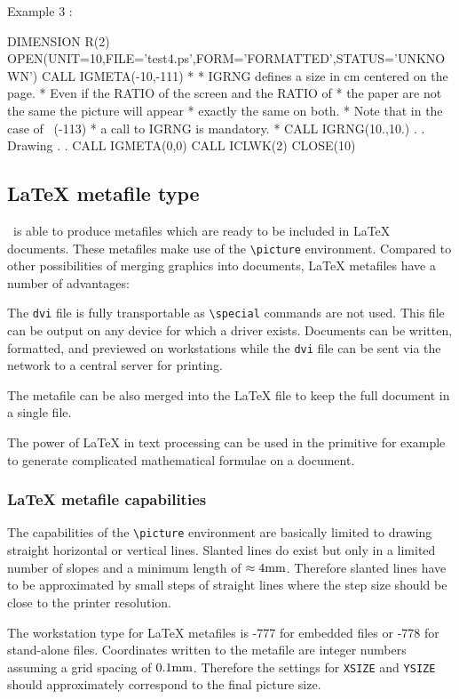 \begin{XMPt}{Example 3 : }

      DIMENSION R(2)
      OPEN(UNIT=10,FILE='test4.ps',FORM='FORMATTED',STATUS='UNKNOWN')
      CALL IGMETA(-10,-111)
*
*              IGRNG defines a size in cm centered on the page.
*              Even if the RATIO of the screen and the RATIO of
*              the paper are not the same the picture will appear
*              exactly the same on both.
*              Note that in the case of \EPS~(-113)
*              a call to IGRNG is mandatory.
*
      CALL IGRNG(10.,10.)
          .
          .
        Drawing
          .
          .
      CALL IGMETA(0,0)
      CALL ICLWK(2)
      CLOSE(10)
\end{XMPt}
\subsection{\LaTeX{} metafile type}
\HIGZ~is able to produce metafiles which are ready to be included in \LaTeX{}
documents. These metafiles make use of the \verb'\picture' environment.
Compared to other possibilities of merging graphics
into documents, \LaTeX{} metafiles have a number of advantages:

\begin{ULc}
\item  The {\tt dvi} file is fully transportable as \verb'\special' commands are
       not used. This file can be output on any device for which a driver
       exists. Documents can be written, formatted, and previewed on
       workstations while the {\tt dvi} file can be sent via the  network to a
       central server for printing.
\item  The metafile can be also merged into the \LaTeX{} file to keep
       the full document in a single file.
\item  The power of \LaTeX{} in text processing can be used in the primitive
        for example to generate complicated mathematical formulae
       on a document.
\end{ULc}

\subsubsection{\LaTeX{} metafile capabilities}

The capabilities of the \verb'\picture' environment are basically limited to
drawing straight horizontal or vertical lines. Slanted lines do exist but only
in a limited number of slopes and a minimum length of $\approx 4 {\rm mm}$.
Therefore slanted lines have to be approximated by small steps of straight lines
where the step size should be close to the printer resolution.
\par
The workstation type for \LaTeX{} metafiles is -777 for embedded files or
-778 for stand-alone files. Coordinates written to the metafile are integer
numbers assuming a grid spacing of $0.1 {\rm mm}$. Therefore the settings for
{\tt XSIZE} and {\tt YSIZE} should approximately correspond to the final
picture size.

